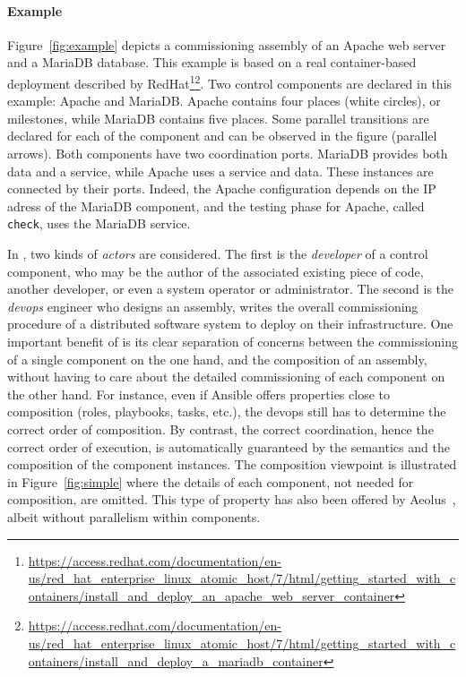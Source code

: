 \paragraph{Example}{
	Figure~\ref{fig:example} depicts a \mad commissioning assembly of an Apache web server and a MariaDB database. This example is based on a real container-based deployment described by RedHat\footnote{\url{https://access.redhat.com/documentation/en-us/red_hat_enterprise_linux_atomic_host/7/html/getting_started_with_containers/install_and_deploy_an_apache_web_server_container}}\footnote{\url{https://access.redhat.com/documentation/en-us/red_hat_enterprise_linux_atomic_host/7/html/getting_started_with_containers/install_and_deploy_a_mariadb_container}}. Two \mad control components are declared in this example: Apache and MariaDB. Apache contains four places (white circles), or milestones, while MariaDB contains five places. Some parallel transitions are declared for each of the component and can be observed in the figure (parallel arrows). Both components have two coordination ports. MariaDB provides both data and a service, while Apache uses a service and data. These instances are connected by their ports. Indeed, the Apache configuration depends on the IP adress of the MariaDB component, and the testing phase for Apache, called \texttt{check}, uses the MariaDB service.
} %

In \mad, two kinds of \emph{actors} are considered. The first is the \emph{developer} of a control component, who may be the author of the associated existing piece of code, another developer, or even a system operator or administrator. The second is the \emph{devops} engineer who designs an assembly, \ie writes the overall commissioning procedure of a distributed software system to deploy on their infrastructure. One important benefit of \mad is its clear separation of concerns between the commissioning of a single component on the one hand, and the composition of an assembly, without having to care about the detailed commissioning of each component on the other hand. For instance, even if Ansible offers properties close to composition (\eg roles, playbooks, tasks, etc.), the devops still has to determine the correct order of composition. By contrast, the correct coordination, hence the correct order of execution, is automatically guaranteed by the \mad semantics and the composition of the component instances. The composition viewpoint is illustrated in Figure~\ref{fig:simple} where the details of each component, not needed for composition, are omitted. This type of property has also been offered by Aeolus~\cite{dicosmo2014ic}, albeit without parallelism within components.

